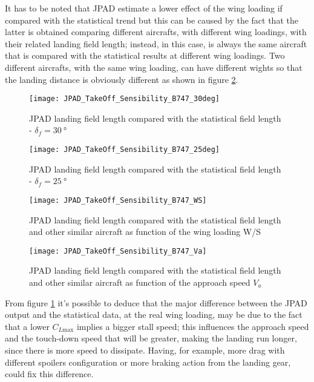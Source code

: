 \bigskip
\noindent
It has to be noted that \gls{JPAD} estimate a lower effect of the wing loading if compared with the statistical trend but this can be caused by the fact that the latter is obtained comparing different aircrafts, with different wing loadings, with their related landing field length; instead, in this case, is always the same aircraft that is compared with the statistical results at different wing loadings. Two different aircrafts, with the same wing loading, can have different wights so that the landing distance is obviously different as shown in figure \ref{fig:LandingWSAircraft}.
%
\clearpage
%
\begin{figure}[H]
\centering
\texttt{[image: JPAD\_TakeOff\_Sensibility\_B747\_30deg]}
\caption{\gls{JPAD} landing field length compared with the statistical field length - $\delta_f=\SI{30}{\degree}$}
\end{figure}
%
\begin{figure}[H]
\centering
\texttt{[image: JPAD\_TakeOff\_Sensibility\_B747\_25deg]}
\caption{\gls{JPAD} landing field length compared with the statistical field length - $\delta_f=\SI{25}{\degree}$}
\label{fig:LandingWS25}
\end{figure}
%
\begin{figure}[H]
\centering
\texttt{[image: JPAD\_TakeOff\_Sensibility\_B747\_WS]}
\caption{\gls{JPAD} landing field length compared with the statistical field length and other similar aircraft as function of the wing loading W/S}
\label{fig:LandingWSAircraft}
\end{figure}
%
\begin{figure}[H]
\centering
\texttt{[image: JPAD\_TakeOff\_Sensibility\_B747\_Va]}
\caption{\gls{JPAD} landing field length compared with the statistical field length and other similar aircraft as function of the approach speed $V_a$}
\label{fig:LandingVa}
\end{figure}
%
\clearpage
%
\noindent
From figure \ref{fig:LandingWS25} it's possible to deduce that the major difference between the \gls{JPAD} output and the statistical data, at the real wing loading, may be due to the fact that a lower $C_{L\text{max}}$ implies a bigger stall speed; this influences the approach speed and the touch-down speed that will be greater, making the landing run longer, since there is more speed to dissipate. Having, for example, more drag with different spoilers configuration or more braking action from the landing gear, could fix this difference.

